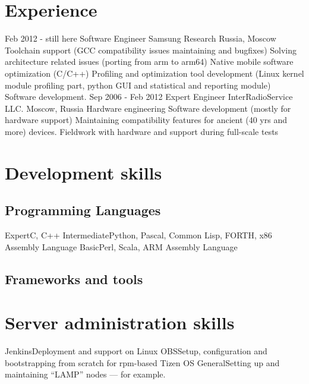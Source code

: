 \documentclass[11pt,a4paper]{moderncv}
\begin{document}
\section{Experience}
\cventry
  {Feb 2012 - still here}
  {Software Engineer}
  {Samsung Research Russia, Moscow}
  {}{}
  {Toolchain support (GCC compatibility issues maintaining and bugfixes)\newline{}
Solving architecture related issues (porting from arm to arm64)\newline{}
Native mobile software optimization (C/C++)\newline{}
Profiling and optimization tool development (Linux kernel module profiling part, python GUI and statistical and reporting module)\newline{}
Software development.}
\cventry
  {Sep 2006 - Feb 2012}
  {Expert Engineer}
  {InterRadioService LLC. Moscow, Russia}
  {}{}
  {Hardware engineering\newline{}
Software development (mostly for hardware support)\newline{}
Maintaining compatibility features for ancient (40 yrs and more) devices.\newline{}
Fieldwork with hardware and support during full-scale tests\newline{}}

\section{Development skills}
\subsection{Programming Languages}
\cvitem
  {Expert}{C, C++}
\cvitem
  {Intermediate}{Python, Pascal, Common Lisp, FORTH, x86 Assembly Language}
\cvitem
  {Basic}{Perl, Scala, ARM Assembly Language}
\subsection{Frameworks and tools}

\section{Server administration skills}
\cvitem
  {Jenkins}{Deployment and support on Linux}
\cvitem
  {OBS}{Setup, configuration and bootstrapping from scratch for rpm-based Tizen OS}
\cvitem
  {General}{Setting up and maintaining ``LAMP'' nodes —  for example.}
\end{document}
